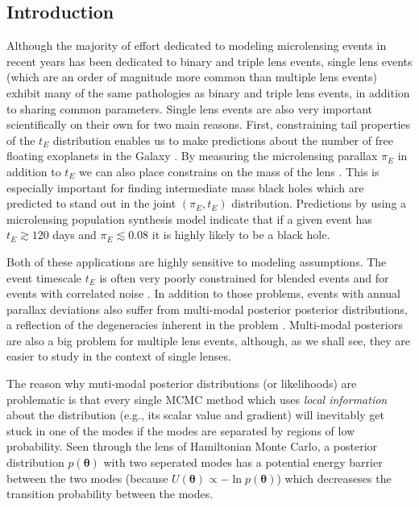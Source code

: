\documentclass[12pt,dvipsnames]{report}
\renewcommand{\vec}[1]{\boldsymbol{\mathbf{#1}}}
\begin{document}
\subsection{Introduction}
Although the majority of effort dedicated to modeling microlensing events in recent 
years has been dedicated to binary and triple lens events, single lens events (which are
an order of magnitude more common than multiple lens events) exhibit many of the same 
pathologies as binary and triple lens events, in addition to  
sharing common parameters. Single lens events are also very important scientifically 
on their own for two main reasons. First, constraining tail properties of the $t_E$ 
distribution enables us to make predictions about the number of free floating exoplanets
in the Galaxy \citep{sumi_unbound_2011,mroz_no_2017}. By measuring the microlensing 
parallax $\pi_E$ in addition to $t_E$ we can also place constrains on the mass of the 
lens \citep{2016MNRAS.458.3012W}. This is especially important for finding intermediate 
mass black holes which are predicted to stand out in the joint $(\pi_E, t_E)$ 
distribution. Predictions by \citet{2020ApJ...889...31L} using a microlensing population 
synthesis model indicate that if a given event has $t_E\gtrsim 120$ days and 
$\pi_E\lesssim 0.08$ it is highly likely to be a black hole.

Both of these applications are highly sensitive to modeling assumptions. The event 
timescale $t_E$ is often very poorly constrained \citep{2009MNRAS.393..816D} for 
blended events and for events with correlated noise \citep{golovich2022}. 
In addition to those problems, events with annual parallax 
deviations also suffer from multi-modal posterior posterior distributions, a 
reflection of the degeneracies inherent in the problem \citep{2004ApJ...606..319G}.
Multi-modal posteriors are also a big problem for multiple lens events, although, 
as we shall see, they are easier to study in the context of single lenses. 

The reason why muti-modal posterior distributions (or likelihoods) are problematic is 
that every single MCMC method which uses \emph{local information} 
about the distribution (e.g., its scalar value and gradient) will inevitably get 
stuck in one of the modes if the modes are separated by regions of low probability. 
Seen through the lens of Hamiltonian Monte Carlo, a posterior distribution 
$p(\vec\theta)$ with two seperated modes has a potential energy barrier between the 
two modes (because  $U(\vec\theta)\propto -\ln p(\vec\theta)$) which decreaseses
the transition probability between the modes.
\end{document}
